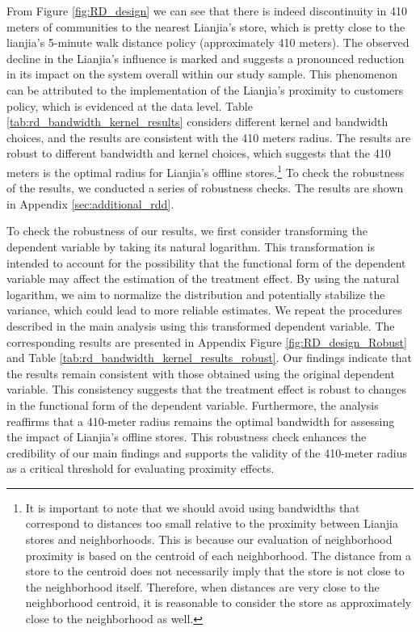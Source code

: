 \documentclass[11pt]{article}
\begin{document}


From Figure \ref{fig:RD_design} we can see that there is indeed discontinuity in 410 meters of communities to the nearest Lianjia's store, which is pretty close to the lianjia's 5-minute walk distance policy (approximately 410 meters). The observed decline in the Lianjia's influence is marked and suggests a pronounced reduction in its impact on the system overall within our study sample. This phenomenon can be attributed to the implementation of the Lianjia's proximity to customers policy, which is evidenced at the data level. Table \ref{tab:rd_bandwidth_kernel_results} considers different kernel and bandwidth choices, and the results are consistent with the 410 meters radius. The results are robust to different bandwidth and kernel choices, which suggests that the 410 meters is the optimal radius for Lianjia's offline stores.\footnote{It is important to note that we should avoid using bandwidths that correspond to distances too small relative to the proximity between Lianjia stores and neighborhoods. This is because our evaluation of neighborhood proximity is based on the centroid of each neighborhood. The distance from a store to the centroid does not necessarily imply that the store is not close to the neighborhood itself. Therefore, when distances are very close to the neighborhood centroid, it is reasonable to consider the store as approximately close to the neighborhood as well.} To check the robustness of the results, we conducted a series of robustness checks. The results are shown in Appendix \ref{sec:additional_rdd}.

To check the robustness of our results, we first consider transforming the dependent variable by taking its natural logarithm. This transformation is intended to account for the possibility that the functional form of the dependent variable may affect the estimation of the treatment effect. By using the natural logarithm, we aim to normalize the distribution and potentially stabilize the variance, which could lead to more reliable estimates. We repeat the procedures described in the main analysis using this transformed dependent variable. The corresponding results are presented in Appendix Figure \ref{fig:RD_design_Robust} and Table \ref{tab:rd_bandwidth_kernel_results_robust}. Our findings indicate that the results remain consistent with those obtained using the original dependent variable. This consistency suggests that the treatment effect is robust to changes in the functional form of the dependent variable. Furthermore, the analysis reaffirms that a 410-meter radius remains the optimal bandwidth for assessing the impact of Lianjia's offline stores. This robustness check enhances the credibility of our main findings and supports the validity of the 410-meter radius as a critical threshold for evaluating proximity effects.
\end{document}
